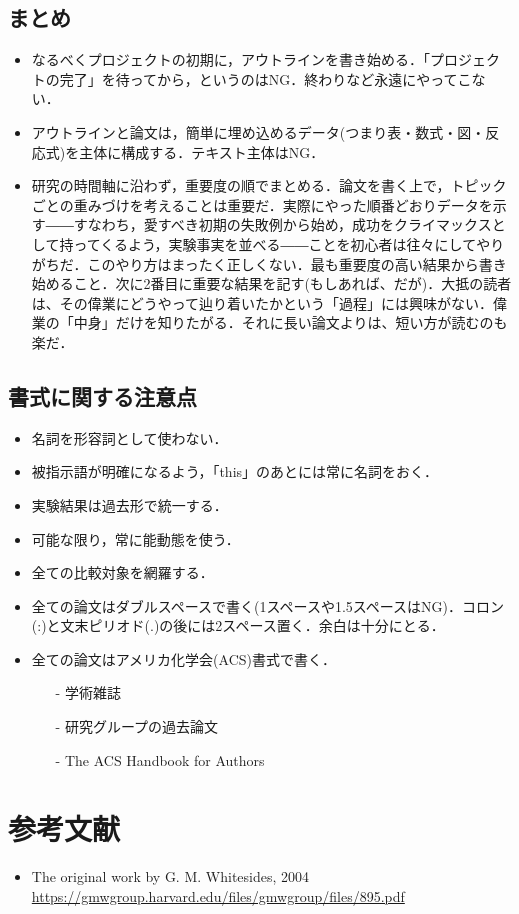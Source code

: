 \documentclass[twocolumn, 10pt,a4j]{jarticle}
\begin{document}
    \subsection{まとめ}
    \begin{itemize}
      \item なるべくプロジェクトの初期に，アウトラインを書き始める．「プロジェクトの完了」を待ってから，というのはNG．終わりなど永遠にやってこない．
      \item アウトラインと論文は，簡単に埋め込めるデータ(つまり表・数式・図・反応式)を主体に構成する．テキスト主体はNG．
      \item 研究の時間軸に沿わず，重要度の順でまとめる．論文を書く上で，トピックごとの重みづけを考えることは重要だ．実際にやった順番どおりデータを示す――すなわち，愛すべき初期の失敗例から始め，成功をクライマックスとして持ってくるよう，実験事実を並べる――ことを初心者は往々にしてやりがちだ．このやり方はまったく正しくない．最も重要度の高い結果から書き始めること．次に2番目に重要な結果を記す(もしあれば、だが)．大抵の読者は、その偉業にどうやって辿り着いたかという「過程」には興味がない．偉業の「中身」だけを知りたがる．それに長い論文よりは、短い方が読むのも楽だ．
    \end{itemize}

    \subsection{書式に関する注意点}
    \begin{itemize}
      \item 名詞を形容詞として使わない．
      \item 被指示語が明確になるよう，「this」のあとには常に名詞をおく．
      \item 実験結果は過去形で統一する．
      \item 可能な限り，常に能動態を使う．
      \item 全ての比較対象を網羅する．
      \item 全ての論文はダブルスペースで書く(1スペースや1.5スペースはNG)．コロン(:)と文末ピリオド(.)の後には2スペース置く．余白は十分にとる．
      \item 全ての論文はアメリカ化学会(ACS)書式で書く．
      \begin{itemize}
        \item[-] 学術雑誌
        \item[-] 研究グループの過去論文
        \item[-] The ACS Handbook for Authors
      \end{itemize}
    \end{itemize}

  \section{参考文献}
  \begin{itemize}
    \item The original work by G. M. Whitesides, 2004 \\ \url{https://gmwgroup.harvard.edu/files/gmwgroup/files/895.pdf}
  \end{itemize}
\end{document}
